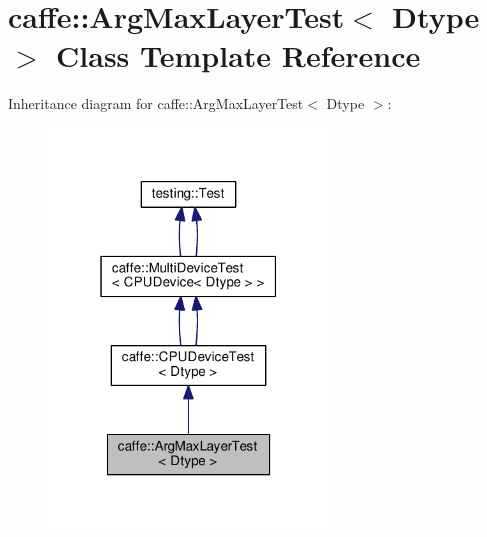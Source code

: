 \hypertarget{classcaffe_1_1_arg_max_layer_test}{}\section{caffe\+:\+:Arg\+Max\+Layer\+Test$<$ Dtype $>$ Class Template Reference}
\label{classcaffe_1_1_arg_max_layer_test}


Inheritance diagram for caffe\+:\+:Arg\+Max\+Layer\+Test$<$ Dtype $>$\+:
\nopagebreak
\begin{figure}[H]
\begin{center}
\leavevmode
\includegraphics[width=211pt]{classcaffe_1_1_arg_max_layer_test__inherit__graph}
\end{center}
\end{figure}
